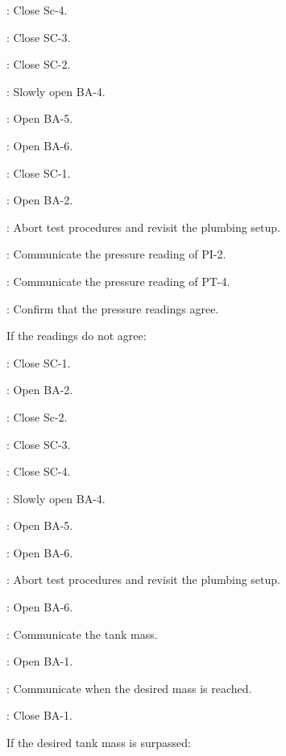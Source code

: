 \begin{checklist}
\begin{checklist}
            \item \primary{}: Close Sc-4.
            \item \primary{}: Close SC-3.
            \item \primary{}: Close SC-2. 
            \item \primary{}: Slowly open BA-4.
            \item \primary{}: Open BA-5. 
            \item \primary{}: Open BA-6. 
            \item \primary{}: Close SC-1.
            \item \primary{}: Open BA-2. 
            \item \ops{}: Abort test procedures and revisit the plumbing setup. 
    \end{checklist}
    \item \primary{}: Communicate the pressure reading of PI-2. 
    \item \daq{}: Communicate the pressure reading of PT-4.
    \item \ops{}: Confirm that the pressure readings agree. 
    \item If the readings do not agree:
    \begin{checklist}
            \item \primary{}: Close SC-1.
            \item \primary{}: Open BA-2.
            \item \primary{}: Close Sc-2.
            \item \primary{}: Close SC-3.
            \item \primary{}: Close SC-4. 
            \item \primary{}: Slowly open BA-4.
            \item \primary{}: Open BA-5. 
            \item \primary{}: Open BA-6. 
            \item \ops{}: Abort test procedures and revisit the plumbing setup. 
    \end{checklist}
    \item \primary{}: Open BA-6.
    \item \daq{}: Communicate the tank mass.
    \item \primary{}: Open BA-1.
    \item \daq{}: Communicate when the desired mass is reached. 
    \item \primary{}: Close BA-1. 
    \item If the desired tank mass is surpassed:

\end{checklist}
